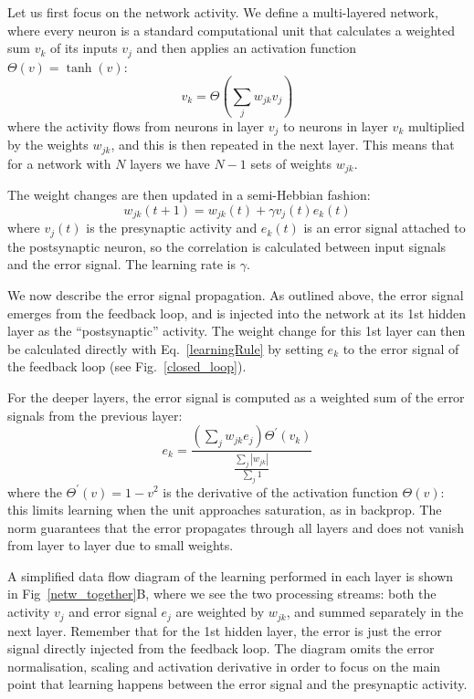 \documentclass{aamas2017}
\begin{document}
Let us first focus on the network activity. We
define a multi-layered network, where every neuron is a standard
computational unit that calculates a weighted sum $v_k$ of its inputs $v_j$ and
then applies an activation function $\Theta(v) = \tanh(v)$:
\begin{equation}
  v_k = \Theta\left( \sum_j w_{jk} v_{j} \right) \label{act_sum}
\end{equation}
where the activity flows from neurons in layer $v_j$ to neurons in
layer $v_k$ multiplied by the weights $w_{jk}$, and this
is then repeated in the next layer. This means that for a network with
$N$ layers we have $N-1$ sets of weights $w_{jk}$.

The weight changes are then updated in a semi-Hebbian fashion:
\begin{equation}
  w_{jk}(t+1) = w_{jk}(t) + \gamma v_j(t)  e_k(t) \label{learningRule}
\end{equation}
where $v_j(t)$ is the presynaptic activity and $e_k(t)$ is an error signal
attached to the postsynaptic neuron, so the correlation is
calculated between input signals and the error signal.
The learning rate is $\gamma$.

We now describe the error signal propagation. As outlined above, the
error signal emerges from the feedback loop, and is injected into the
network at its 1st hidden layer as the ``postsynaptic'' activity. The
weight change for this 1st layer can then be calculated directly with
Eq.~\ref{learningRule} by setting $e_k$ to the error signal of the
feedback loop (see Fig.~\ref{closed_loop}).

For the deeper layers, the error signal is computed as a weighted
sum of the error signals from the previous layer:
\begin{equation}
e_k = \frac{\left( \sum_j w_{jk} e_{j} \right) \Theta^\prime (v_k) }{\frac{\sum_j {|w_{jk}|}}{\sum_j 1}}
\end{equation}
where the $\Theta^\prime (v) = 1 - v^2$ is the derivative of the
activation function $\Theta(v)$: this limits learning when the unit
approaches saturation, as in backprop. The norm guarantees that
the error propagates through all layers and does not vanish from
layer to layer due to small weights.


A simplified data flow diagram of the learning performed in each layer
is shown in Fig~\ref{netw_together}B, where we see the two processing
streams: both the activity $v_j$ and error signal $e_j$ are weighted
by $w_{jk}$, and summed separately in the next layer. Remember that
for the 1st hidden layer, the error is just the error signal
directly injected from the feedback loop. The diagram omits the error
normalisation, scaling and activation derivative in order to focus on
the main point that learning happens between the error signal and the
presynaptic activity.
\end{document}
